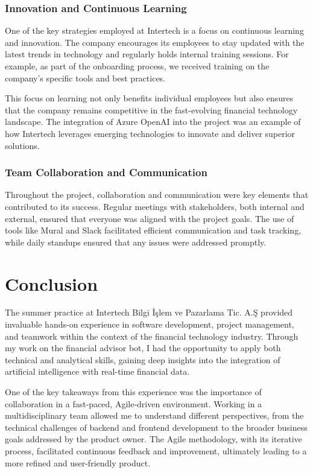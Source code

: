 \documentclass[a4paper,12pt]{report}
\begin{document}
\subsection*{Innovation and Continuous Learning}
One of the key strategies employed at Intertech is a focus on continuous learning and innovation. The company encourages its employees to stay updated with the latest trends in technology and regularly holds internal training sessions. For example, as part of the onboarding process, we received training on the company’s specific tools and best practices.

This focus on learning not only benefits individual employees but also ensures that the company remains competitive in the fast-evolving financial technology landscape. The integration of Azure OpenAI into the project was an example of how Intertech leverages emerging technologies to innovate and deliver superior solutions.

\subsection*{Team Collaboration and Communication}
Throughout the project, collaboration and communication were key elements that contributed to its success. Regular meetings with stakeholders, both internal and external, ensured that everyone was aligned with the project goals. The use of tools like Mural and Slack facilitated efficient communication and task tracking, while daily standups ensured that any issues were addressed promptly.


\chapter{Conclusion}
The summer practice at Intertech Bilgi İşlem ve Pazarlama Tic. A.Ş provided invaluable hands-on experience in software development, project management, and teamwork within the context of the financial technology industry. Through my work on the financial advisor bot, I had the opportunity to apply both technical and analytical skills, gaining deep insights into the integration of artificial intelligence with real-time financial data.

One of the key takeaways from this experience was the importance of collaboration in a fast-paced, Agile-driven environment. Working in a multidisciplinary team allowed me to understand different perspectives, from the technical challenges of backend and frontend development to the broader business goals addressed by the product owner. The Agile methodology, with its iterative process, facilitated continuous feedback and improvement, ultimately leading to a more refined and user-friendly product.
\end{document}
